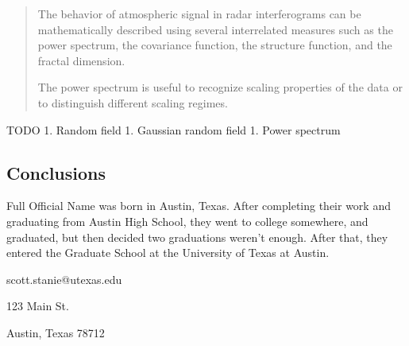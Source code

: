 \documentclass{utexasthesis}
\begin{document}
\begin{quote}
    
The behavior of atmospheric signal in radar interferograms can be mathematically described using several interrelated measures such as the power spectrum, the covariance function, the structure function, and the fractal dimension.

The power spectrum is useful to recognize scaling properties of the data or to distinguish different scaling regimes.
\end{quote}

TODO 1. Random field 1. Gaussian random field 1. Power spectrum


\subsection{Conclusions}





\begin{vita}
  Full Official Name was born in Austin, Texas. After completing their work and graduating from Austin High School, they went to college somewhere, and graduated, but then decided two graduations weren't enough.
  After that, they entered the Graduate School at the University of Texas at Austin.

  \begin{address}
    scott.stanie@utexas.edu

    123 Main St.

    Austin, Texas 78712
  \end{address}

\end{vita}
\end{document}
